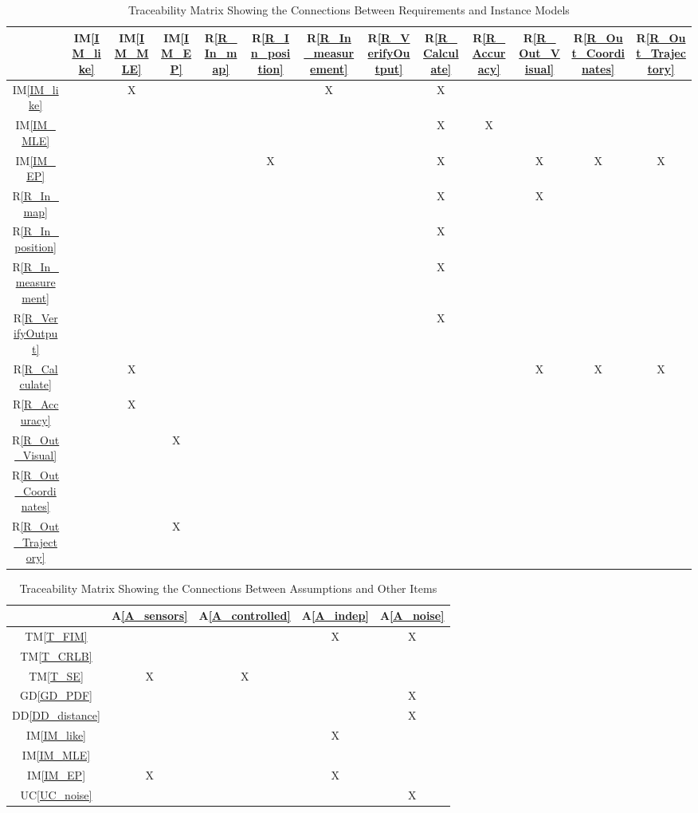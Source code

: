 \documentclass[12pt]{article}
\newcommand{\dref}[1]{GD\ref{#1}}
\newcommand{\ddref}[1]{DD\ref{#1}}
\newcommand{\tref}[1]{TM\ref{#1}}
\newcommand{\aref}[1]{A\ref{#1}}
\newcommand{\iref}[1]{IM\ref{#1}}
\newcommand{\rref}[1]{R\ref{#1}}
\newcommand{\ucref}[1]{UC\ref{#1}}
\begin{document}
\begin{table}[h!]
\centering
\begin{tabular}{|c|c|c|c|c|c|c|c|c|c|c|c|c|}
\hline
	& \iref{IM_like}& \iref{IM_MLE}& \iref{IM_EP}& \rref{R_In_map}& \rref{R_In_position}&\rref{R_In_measurement}& \rref{R_VerifyOutput}& \rref{R_Calculate}& \rref{R_Accuracy}& \rref{R_Out_Visual}& \rref{R_Out_Coordinates} & \rref{R_Out_Trajectory}\\
\hline
\iref{IM_like}                & & X& & & & X& & X& & & &\\ \hline
\iref{IM_MLE}                 & & & & & & & & X& X& & &\\ \hline
\iref{IM_EP}                  & & & & & X& & & X& & X& X&X\\ \hline
\rref{R_In_map}               & & & & & & & & X& & X& &\\ \hline
\rref{R_In_position}          & & & & & & & & X& & & &\\ \hline
\rref{R_In_measurement}       & & & & & & & & X& & & &\\ \hline
\rref{R_VerifyOutput}         & & & & & & & & X& & & &\\ \hline
\rref{R_Calculate}            & &X & & & & & & & & X& X&X\\ \hline
\rref{R_Accuracy}             & &X & & & & & & & & & &\\ \hline
\rref{R_Out_Visual}           & & & X& & & & & & & & &\\ \hline
\rref{R_Out_Coordinates}      & & & & & & & & & & & &\\ \hline
\rref{R_Out_Trajectory}       & & & X& & & & & & & & &\\
\hline
\end{tabular}
\caption{Traceability Matrix Showing the Connections Between Requirements and Instance Models}
\label{Table:R_trace}
\end{table}

\begin{table}[h!]
\centering
\begin{tabular}{|c|c|c|c|c|}
\hline
	& \aref{A_sensors}& \aref{A_controlled}& \aref{A_indep}& \aref{A_noise} \\
\hline
\tref{T_FIM}         & & &X &X  \\ \hline
\tref{T_CRLB}        & & & &  \\ \hline
\tref{T_SE}          &X &X & &  \\ \hline
\dref{GD_PDF}        & & & & X \\ \hline
\ddref{DD_distance}  & & & &X \\ \hline
\iref{IM_like}       & & &X & \\ \hline
\iref{IM_MLE}        & & & & \\ \hline
\iref{IM_EP}        &X & &X & \\ \hline
\ucref{UC_noise}     & & & &X\\
\hline
\end{tabular}
\caption{Traceability Matrix Showing the Connections Between Assumptions and Other Items}
\label{Table:A_trace}
\end{table}

\clearpage



\end{document}
